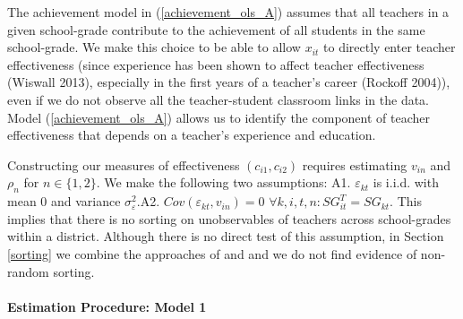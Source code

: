 \documentclass[notitlepage,12pt]{article}%
\begin{document}
The achievement model in (\ref{achievement_ols_A}) assumes that all teachers
in a given school-grade contribute to the achievement of all students in the
same school-grade. We make this choice to be able to allow $x_{it}$ to
directly enter teacher effectiveness (since experience has been shown to
affect teacher effectiveness (Wiswall 2013), especially in the first years of
a teacher's career (Rockoff 2004)), even if we do not observe all the
teacher-student classroom links in the data. Model (\ref{achievement_ols_A})
allows us to identify the component of teacher effectiveness that depends on a
teacher's experience and education.

Constructing our measures of effectiveness $(c_{i1},c_{i2})$ requires
estimating $v_{in}$ and $\rho_{n}$ for $n\in\{1,2\}$. We make the following
two assumptions: \newline A1. $\varepsilon_{kt}$ is i.i.d. with mean 0 and
variance $\sigma_{\varepsilon}^{2}$.\newline A2. $Cov(\varepsilon_{kt}%
,v_{in})=0$ $\forall k,i,t,n:SG_{it}^{T}=SG_{kt}$. This implies that there is
no sorting on unobservables of teachers across school-grades within a
district. Although there is no direct test of this assumption, in Section
\ref{sorting} we combine the approaches of \citet{chetty2014measuring} and
\citet{rothstein2010teacher} and we do not find evidence of non-random sorting.

\paragraph{Estimation Procedure: Model 1}
\end{document}
